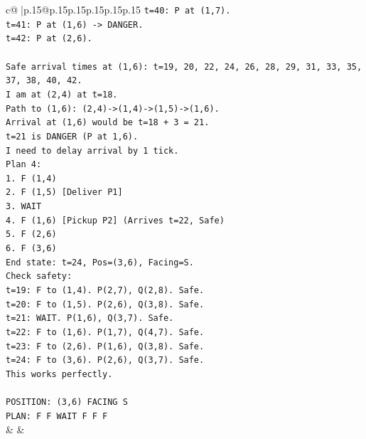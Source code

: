 \documentclass{article}
\begin{document}
{\begin{supertabular}{c@{$\;$}|p{.15\linewidth}@{}p{.15\linewidth}p{.15\linewidth}p{.15\linewidth}p{.15\linewidth}p{.15\linewidth}}
{{{\texttt{t=40: P at (1,7).} \\
\texttt{t=41: P at (1,6) {-}> DANGER.} \\
\texttt{t=42: P at (2,6).} \\
\\ 
\texttt{Safe arrival times at (1,6): t=19, 20, 22, 24, 26, 28, 29, 31, 33, 35, 37, 38, 40, 42.} \\
\texttt{I am at (2,4) at t=18.} \\
\texttt{Path to (1,6): (2,4){-}>(1,4){-}>(1,5){-}>(1,6).} \\
\texttt{Arrival at (1,6) would be t=18 + 3 = 21.} \\
\texttt{t=21 is DANGER (P at 1,6).} \\
\texttt{I need to delay arrival by 1 tick.} \\
\texttt{Plan 4:} \\
\texttt{1. F (1,4)} \\
\texttt{2. F (1,5) {[}Deliver P1{]}} \\
\texttt{3. WAIT} \\
\texttt{4. F (1,6) {[}Pickup P2{]} (Arrives t=22, Safe)} \\
\texttt{5. F (2,6)} \\
\texttt{6. F (3,6)} \\
\texttt{End state: t=24, Pos=(3,6), Facing=S.} \\
\texttt{Check safety:} \\
\texttt{t=19: F to (1,4). P(2,7), Q(2,8). Safe.} \\
\texttt{t=20: F to (1,5). P(2,6), Q(3,8). Safe.} \\
\texttt{t=21: WAIT. P(1,6), Q(3,7). Safe.} \\
\texttt{t=22: F to (1,6). P(1,7), Q(4,7). Safe.} \\
\texttt{t=23: F to (2,6). P(1,6), Q(3,8). Safe.} \\
\texttt{t=24: F to (3,6). P(2,6), Q(3,7). Safe.} \\
\texttt{This works perfectly.} \\
\\ 
\texttt{POSITION: (3,6) FACING S} \\
\texttt{PLAN: F F WAIT F F F} \\
            }
        }
    }
    & & \\ \\


\end{supertabular}}
\end{document}
